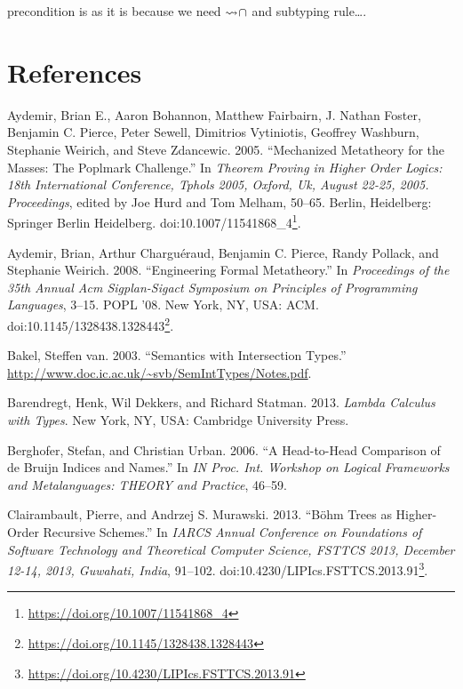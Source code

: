 \documentclass[a4paper, 12pt, twoside]{style/ociamthesis}
\theoremstyle{plain}
\theoremstyle{definition}
\theoremstyle{remark}
\renewcommand{\href}[2]{#2\footnote{\url{#1}}}
\newcommand{\tocap}{\leadsto\kern-.5ex\cap}
\begin{document}
precondition is as it is because we need \(\tocap\) and subtyping
rule\ldots{}.

\footnotesize

\chapter*{References}\label{references}

\hypertarget{refs}{}
\hypertarget{ref-aydemir05}{}
Aydemir, Brian E., Aaron Bohannon, Matthew Fairbairn, J. Nathan Foster,
Benjamin C. Pierce, Peter Sewell, Dimitrios Vytiniotis, Geoffrey
Washburn, Stephanie Weirich, and Steve Zdancewic. 2005. ``Mechanized
Metatheory for the Masses: The Poplmark Challenge.'' In \emph{Theorem
Proving in Higher Order Logics: 18th International Conference, Tphols
2005, Oxford, Uk, August 22-25, 2005. Proceedings}, edited by Joe Hurd
and Tom Melham, 50--65. Berlin, Heidelberg: Springer Berlin Heidelberg.
doi:\href{https://doi.org/10.1007/11541868_4}{10.1007/11541868\_4}.

\hypertarget{ref-aydemir08}{}
Aydemir, Brian, Arthur Charguéraud, Benjamin C. Pierce, Randy Pollack,
and Stephanie Weirich. 2008. ``Engineering Formal Metatheory.'' In
\emph{Proceedings of the 35th Annual Acm Sigplan-Sigact Symposium on
Principles of Programming Languages}, 3--15. POPL '08. New York, NY,
USA: ACM.
doi:\href{https://doi.org/10.1145/1328438.1328443}{10.1145/1328438.1328443}.

\hypertarget{ref-bakel}{}
Bakel, Steffen van. 2003. ``Semantics with Intersection Types.''
\url{http://www.doc.ic.ac.uk/~svb/SemIntTypes/Notes.pdf}.

\hypertarget{ref-barendregt13}{}
Barendregt, Henk, Wil Dekkers, and Richard Statman. 2013. \emph{Lambda
Calculus with Types}. New York, NY, USA: Cambridge University Press.

\hypertarget{ref-berghofer06}{}
Berghofer, Stefan, and Christian Urban. 2006. ``A Head-to-Head
Comparison of de Bruijn Indices and Names.'' In \emph{IN Proc. Int.
Workshop on Logical Frameworks and Metalanguages: THEORY and Practice},
46--59.

\hypertarget{ref-clairambault13}{}
Clairambault, Pierre, and Andrzej S. Murawski. 2013. ``Böhm Trees as
Higher-Order Recursive Schemes.'' In \emph{IARCS Annual Conference on
Foundations of Software Technology and Theoretical Computer Science,
FSTTCS 2013, December 12-14, 2013, Guwahati, India}, 91--102.
doi:\href{https://doi.org/10.4230/LIPIcs.FSTTCS.2013.91}{10.4230/LIPIcs.FSTTCS.2013.91}.
\end{document}
